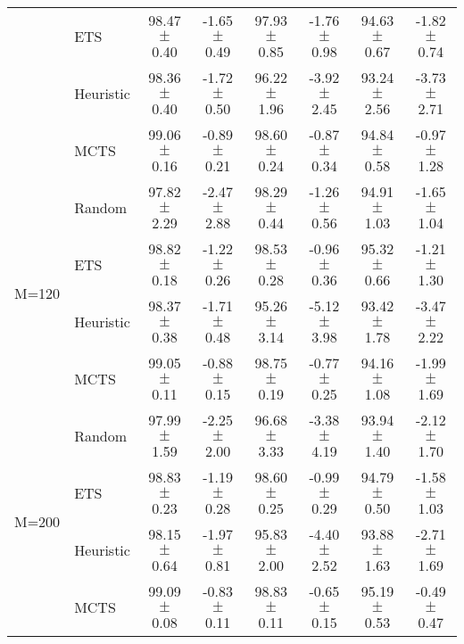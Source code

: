 \begin{tabular}{llcccccc}
                       & ETS             & 98.47 $\pm$ 0.40      & -1.65 $\pm$ 0.49     & 97.93 $\pm$ 0.85         & -1.76 $\pm$ 0.98         & 94.63 $\pm$ 0.67       & -1.82 $\pm$ 0.74       \\
                       & Heuristic         & 98.36 $\pm$ 0.40      & -1.72 $\pm$ 0.50     & 96.22 $\pm$ 1.96         & -3.92 $\pm$ 2.45         & 93.24 $\pm$ 2.56       & -3.73 $\pm$ 2.71       \\
                       & MCTS            & 99.06 $\pm$ 0.16      & -0.89 $\pm$ 0.21     & 98.60 $\pm$ 0.24         & -0.87 $\pm$ 0.34         & 94.84 $\pm$ 0.58       & -0.97 $\pm$ 1.28       \\
\midrule
\multirow{4}{*}{M=120} & Random          & 97.82 $\pm$ 2.29      & -2.47 $\pm$ 2.88     & 98.29 $\pm$ 0.44         & -1.26 $\pm$ 0.56         & 94.91 $\pm$ 1.03       & -1.65 $\pm$ 1.04       \\
                       & ETS             & 98.82 $\pm$ 0.18      & -1.22 $\pm$ 0.26     & 98.53 $\pm$ 0.28         & -0.96 $\pm$ 0.36         & 95.32 $\pm$ 0.66       & -1.21 $\pm$ 1.30       \\
                       & Heuristic         & 98.37 $\pm$ 0.38      & -1.71 $\pm$ 0.48     & 95.26 $\pm$ 3.14         & -5.12 $\pm$ 3.98         & 93.42 $\pm$ 1.78       & -3.47 $\pm$ 2.22       \\
                       & MCTS            & 99.05 $\pm$ 0.11      & -0.88 $\pm$ 0.15     & 98.75 $\pm$ 0.19         & -0.77 $\pm$ 0.25         & 94.16 $\pm$ 1.08       & -1.99 $\pm$ 1.69       \\
\midrule
\multirow{4}{*}{M=200} & Random          & 97.99 $\pm$ 1.59      & -2.25 $\pm$ 2.00     & 96.68 $\pm$ 3.33         & -3.38 $\pm$ 4.19         & 93.94 $\pm$ 1.40       & -2.12 $\pm$ 1.70       \\
                       & ETS             & 98.83 $\pm$ 0.23      & -1.19 $\pm$ 0.28     & 98.60 $\pm$ 0.25         & -0.99 $\pm$ 0.29         & 94.79 $\pm$ 0.50       & -1.58 $\pm$ 1.03       \\
                       & Heuristic         & 98.15 $\pm$ 0.64      & -1.97 $\pm$ 0.81     & 95.83 $\pm$ 2.00         & -4.40 $\pm$ 2.52         & 93.88 $\pm$ 1.63       & -2.71 $\pm$ 1.69       \\
                       & MCTS            & 99.09 $\pm$ 0.08      & -0.83 $\pm$ 0.11     & 98.83 $\pm$ 0.11         & -0.65 $\pm$ 0.15         & 95.19 $\pm$ 0.53       & -0.49 $\pm$ 0.47       \\

\end{tabular}
